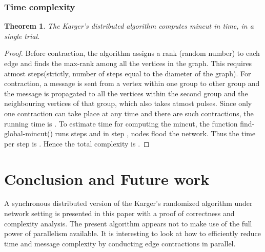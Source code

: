 \documentclass{acm_proc_article-sp}
\begin{document}
\subsubsection{Time complexity}
\newtheorem{mydef15}[mydef14]{Theorem}
\begin{mydef15}
The Karger's distributed algorithm computes mincut in  time, in a single trial.
\end{mydef15}

\begin{proof}
Before contraction, the algorithm assigns a rank (random number) to each edge and finds the max-rank among all the vertices in the graph. This requires atmost  steps(strictly, number of steps equal to the diameter of the graph). For contraction, a message is sent from a vertex within one group to other group and the message is propagated to all the vertices within the second group and the neighbouring vertices of that group, which also takes atmost  pulses. Since only one contraction can take place at any time and there are  such contractions, the running time is .  To estimate time for computing the mincut, the function find-global-mincut() runs  steps and in step ,  nodes flood the network. Thus the time per step is  . Hence the total complexity is .
\end{proof}

\section{Conclusion and Future work}
A synchronous distributed version of the Karger's randomized algorithm under network setting is presented in this paper with a proof of correctness and complexity analysis. The present algorithm appears not to make use of the full power of parallelism available. It is interesting to look at how to efficiently reduce time and message complexity by conducting edge contractions in parallel.



  
\end{document}
